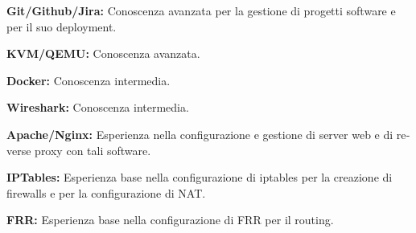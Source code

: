 \documentclass[
    italian,
    a4paper,
    nologo,
    notitle
]{europasscv}
\newcommand{\englishText}[1]{\foreignlanguage{english}{#1}}
\begin{document}
\begin{europasscv}
{\begin{freeitemize}[itemsep=0pt]
            \item \textbf{Git/Github/Jira:} Conoscenza avanzata per la gestione
            di progetti software e per il suo \englishText{deployment}.
            \item \textbf{KVM/QEMU:} Conoscenza avanzata.
            \item \textbf{Docker:} Conoscenza intermedia.
            \item \textbf{Wireshark:} Conoscenza intermedia.
            \item \textbf{Apache/Nginx:} Esperienza nella configurazione e
            gestione di server web e di \englishText{reverse proxy} con tali
            software.
            \item \textbf{IPTables:} Esperienza base nella configurazione di
            iptables per la creazione di firewalls e per la configurazione di
            NAT.
            \item \textbf{FRR:} Esperienza base nella configurazione di FRR per
            il routing.
        \end{freeitemize}
    }

    \ecvlanguageheader
    \ecvlanguagefooter
\end{europasscv}
\vspace{1cm}
\newpage
\end{document}
